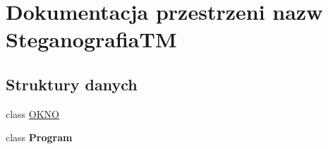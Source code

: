 \hypertarget{namespace_steganografia_t_m}{}\section{Dokumentacja przestrzeni nazw Steganografia\+TM}
\label{namespace_steganografia_t_m}
\subsection*{Struktury danych}
\begin{DoxyCompactItemize}
\item 
class \hyperlink{class_steganografia_t_m_1_1_o_k_n_o}{O\+K\+NO}
\item 
class {\bfseries Program}
\end{DoxyCompactItemize}
